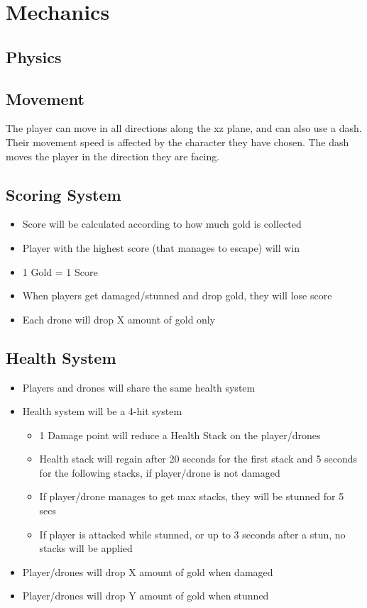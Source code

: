 \documentclass[10pt]{report}
\begin{document}
\section{Mechanics}

\subsection{Physics}

\subsection{Movement}

The player can move in all directions along the xz plane, and can also use a dash. Their movement speed is affected by the character they have chosen. The dash moves the player in the direction they are facing.

\subsection{Scoring System}

\begin{itemize}
    \item Score will be calculated according to how much gold is collected
    \item Player with the highest score (that manages to escape) will win
    \item 1 Gold = 1 Score
    \item When players get damaged/stunned and drop gold, they will lose score
    \item Each drone will drop X amount of gold only
\end{itemize}

\subsection{Health System}

\begin{itemize}
    \item Players and drones will share the same health system
    \item Health system will be a 4-hit system
    \begin{itemize}
        \item 1 Damage point will reduce a Health Stack on the player/drones
        \item Health stack will regain after 20 seconds for the first stack and 5 seconds for the following stacks, if player/drone is not damaged
        \item If player/drone manages to get max stacks, they will be stunned for 5 secs
        \item If player is attacked while stunned, or up to 3 seconds after a stun, no stacks will be applied
    \end{itemize}
    \item Player/drones will drop X amount of gold when damaged
    \item Player/drones will drop Y amount of gold when stunned
\end{itemize}
\end{document}
